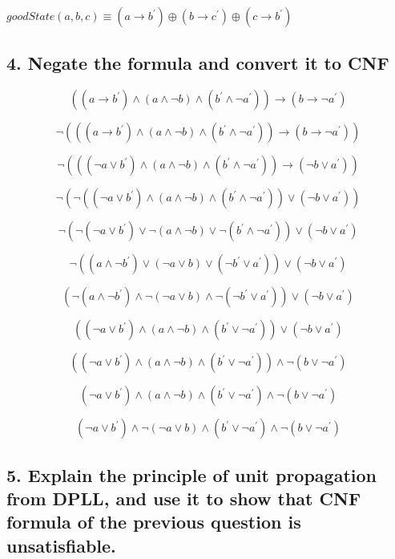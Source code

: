 \documentclass[a4paper, 13pt, draft]{report}
\begin{document}
	\begin{center}
		$ goodState(a, b, c) \equiv (a \rightarrow b^\prime) \oplus (b \rightarrow c^\prime) \oplus (c \rightarrow b^\prime) $
	\end{center}

	\subsection*{4. Negate the formula and convert it to CNF} %

	\[ ((a \rightarrow b^\prime) \wedge (a \wedge \neg b) \wedge (b^\prime \wedge \neg a^\prime)) \rightarrow (b \rightarrow \neg a^\prime) \]

	\hline 

	\[ \neg (((a \rightarrow b^\prime) \wedge (a \wedge \neg b) \wedge (b^\prime \wedge \neg a^\prime)) \rightarrow (b \rightarrow \neg a^\prime)) \]

	\[ \neg (((\neg a \vee b^\prime) \wedge (a \wedge \neg b) \wedge (b^\prime \wedge \neg a^\prime)) \rightarrow (\neg b \vee a^\prime)) \]

	\[ \neg (\neg ((\neg a \vee b^\prime) \wedge (a \wedge \neg b) \wedge (b^\prime \wedge \neg a^\prime)) \vee (\neg b \vee a^\prime)) \]

	\[ \neg (\neg (\neg a \vee b^\prime) \vee \neg (a \wedge \neg b) \vee \neg (b^\prime \wedge \neg a^\prime)) \vee (\neg b \vee a^\prime) \]

	\[ \neg ((a \wedge \neg b^\prime) \vee (\neg a \vee b) \vee (\neg b^\prime \vee a^\prime)) \vee (\neg b \vee a^\prime) \]

	\[ ( \neg (a \wedge \neg b^\prime) \wedge \neg (\neg a \vee b) \wedge \neg (\neg b^\prime \vee a^\prime)) \vee (\neg b \vee a^\prime) \]

	\[ ((\neg a \vee b^\prime) \wedge (a \wedge \neg b) \wedge (b^\prime \vee \neg a^\prime)) \vee (\neg b \vee a^\prime) \]

	\[ ((\neg a \vee b^\prime) \wedge (a \wedge \neg b) \wedge (b^\prime \vee \neg a^\prime)) \wedge \neg (b \vee \neg a^\prime) \]

	\[ (\neg a \vee b^\prime) \wedge (a \wedge \neg b) \wedge (b^\prime \vee \neg a^\prime) \wedge \neg (b \vee \neg a^\prime) \]

	\hline

	\[ (\neg a \vee b^\prime) \wedge \neg (\neg a \vee b) \wedge (b^\prime \vee \neg a^\prime) \wedge \neg (b \vee \neg a^\prime) \]

	\subsection*{%
		5. Explain the principle of unit propagation from DPLL, 
	and use it to show that CNF formula of the previous question is unsatisfiable.}
\end{document}
